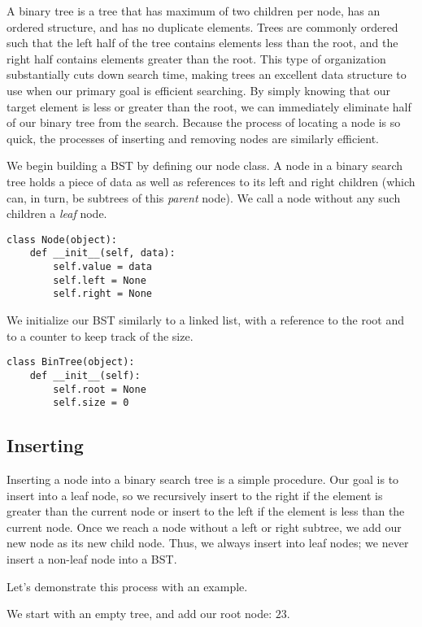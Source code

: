 A binary tree is a tree that has maximum of two children per node, has an ordered structure, and has no duplicate elements.
Trees are commonly ordered such that the left half of the tree contains elements less than the root, and the right half contains elements greater than the root.
This type of organization substantially cuts down search time, making trees an excellent data structure to use when our primary goal is efficient searching.
By simply knowing that our target element is less or greater than the root, we can immediately eliminate half of our binary tree from the search.
Because the process of locating a node is so quick, the processes of inserting and removing nodes are similarly efficient.

We begin building a BST by defining our node class. A node in a binary search tree holds a piece of data as well as references to its left and right children (which can, in turn, be subtrees of this \emph{parent} node).
We call a node without any such children a \emph{leaf} node.

\begin{lstlisting}
class Node(object):
    def __init__(self, data):
        self.value = data
        self.left = None
        self.right = None
\end{lstlisting}
We initialize our BST similarly to a linked list, with a reference to the root and to a counter to keep track of the size.
\begin{lstlisting}
class BinTree(object):
    def __init__(self):
        self.root = None
        self.size = 0
\end{lstlisting}

\subsection*{Inserting}
Inserting a node into a binary search tree is a simple procedure.
Our goal is to insert into a leaf node, so we recursively insert to the right if the element is greater than the current node or insert to the left if the element is less than the current node.
Once we reach a node without a left or right subtree, we add our new node as its new child node.
Thus, we always insert into leaf nodes; we never insert a non-leaf node into a BST.

Let's demonstrate this process with an example.

\begin{minipage}{0.4\textwidth}
\end{minipage}\hfill
\begin{minipage}{0.6\textwidth}
    We start with an empty tree, and add our root node: $23$.
\end{minipage}

